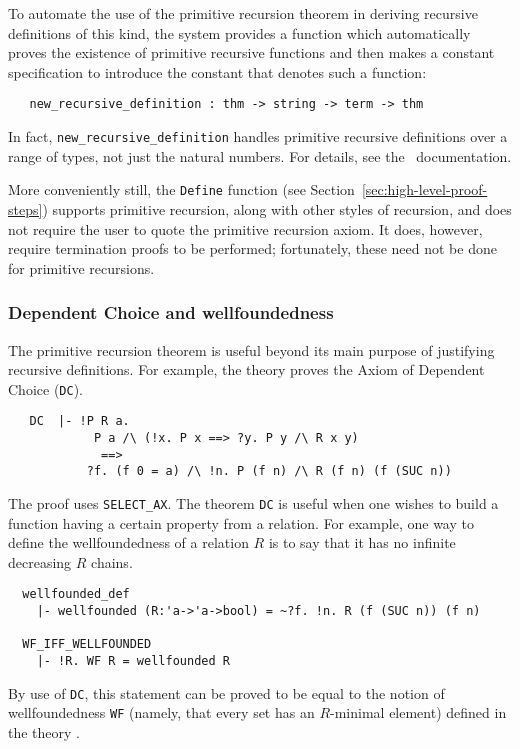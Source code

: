 To automate the use of the primitive recursion theorem in deriving
recursive definitions of this kind, the \HOL{} system provides a function
which automatically proves the existence of primitive recursive
functions and then makes a constant specification to introduce the constant
that denotes such a function:

\begin{boxed}
\begin{verbatim}
   new_recursive_definition : thm -> string -> term -> thm
\end{verbatim}
\end{boxed}

\noindent In fact, {\verb+new_recursive_definition+} handles
primitive recursive definitions over a range of types, not just the
natural numbers. For details, see the \REFERENCE\ documentation.

More conveniently still, the \verb+Define+ function (see
Section~\ref{sec:high-level-proof-steps}) supports primitive
recursion, along with other styles of recursion, and does not require the
user to quote the primitive recursion axiom. It does, however, require
termination proofs to be performed; fortunately, these need not be
done for primitive recursions.

\subsubsection{Dependent Choice and wellfoundedness}
\label{prim-rec-conseq}

The primitive recursion theorem is useful beyond its main purpose of
justifying recursive definitions. For example, the theory
 proves the Axiom of Dependent Choice ({\small\verb+DC+}).

\begin{hol}
{\small
\begin{verbatim}
   DC  |- !P R a.
            P a /\ (!x. P x ==> ?y. P y /\ R x y)
             ==>
           ?f. (f 0 = a) /\ !n. P (f n) /\ R (f n) (f (SUC n))
\end{verbatim}}
\end{hol}

The proof uses {\small\verb+SELECT_AX+}. The theorem {\small\verb+DC+}
is useful when one wishes to build a function having a certain
property from a relation. For example, one way to define the
wellfoundedness of a relation $R$ is to say that it has no infinite
decreasing $R$ chains.
%
\begin{hol}
\begin{verbatim}
  wellfounded_def
    |- wellfounded (R:'a->'a->bool) = ~?f. !n. R (f (SUC n)) (f n)

  WF_IFF_WELLFOUNDED
    |- !R. WF R = wellfounded R
\end{verbatim}
\end{hol}
By use of {\small\verb+DC+}, this statement can be proved
to be equal to the notion of wellfoundedness {\small\verb+WF+}
(namely, that every set has an $R$-minimal element) defined in the theory
.

